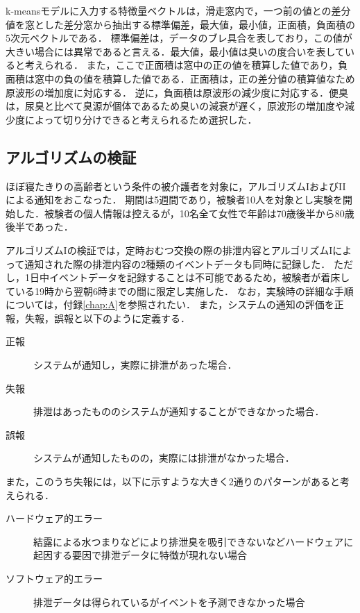 k-meansモデルに入力する特徴量ベクトルは，滑走窓内で，一つ前の値との差分値を窓とした差分窓から抽出する標準偏差，最大値，最小値，正面積，負面積の5次元ベクトルである．
標準偏差は，データのブレ具合を表しており，この値が大きい場合には異常であると言える．最大値，最小値は臭いの度合いを表していると考えられる．
また，ここで正面積は窓中の正の値を積算した値であり，負面積は窓中の負の値を積算した値である．正面積は，正の差分値の積算値なため原波形の増加度に対応する．
逆に，負面積は原波形の減少度に対応する．便臭は，尿臭と比べて臭源が個体であるため臭いの減衰が遅く，原波形の増加度や減少度によって切り分けできると考えられるため選択した．

\subsection{アルゴリズムの検証}\label{chap:3.3.3}
ほぼ寝たきりの高齢者という条件の被介護者を対象に，アルゴリズムIおよびI\hspace{-.1em}Iによる通知をおこなった．
期間は5週間であり，被験者10人を対象とし実験を開始した．被験者の個人情報は控えるが，10名全て女性で年齢は70歳後半から80歳後半であった．

アルゴリズムIの検証では，定時おむつ交換の際の排泄内容とアルゴリズムIによって通知された際の排泄内容の2種類のイベントデータも同時に記録した．
ただし，1日中イベントデータを記録することは不可能であるため，被験者が着床している19時から翌朝6時までの間に限定し実施した．
なお，実験時の詳細な手順については，付録\ref{chap:A}を参照されたい．
また，システムの通知の評価を正報，失報，誤報と以下のように定義する．

\begin{description}
\item[正報] システムが通知し，実際に排泄があった場合．
\item[失報] 排泄はあったもののシステムが通知することができなかった場合．
\item[誤報] システムが通知したものの，実際には排泄がなかった場合．
\end{description}
\par


また，このうち失報には，以下に示すような大きく2通りのパターンがあると考えられる．

\begin{description}
\item[ハードウェア的エラー] 結露による水つまりなどにより排泄臭を吸引できないなどハードウェアに起因する要因で排泄データに特徴が現れない場合
\item[ソフトウェア的エラー] 排泄データは得られているがイベントを予測できなかった場合
\end{description}
\par

